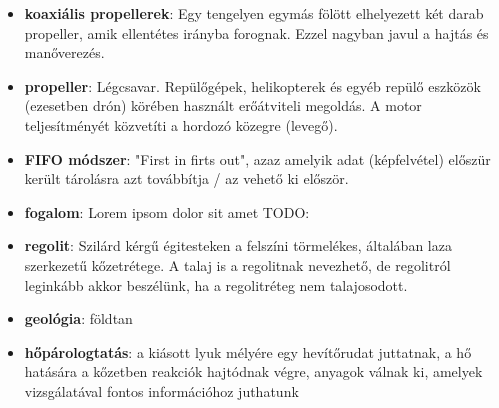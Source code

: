 \documentclass[12pt]{report}
\begin{document}
\begin{itemize}

  \item \textbf{koaxiális propellerek}: Egy tengelyen egymás fölött elhelyezett két darab propeller, amik ellentétes irányba forognak. Ezzel nagyban javul a hajtás és manőverezés.
  \item \textbf{propeller}: Légcsavar. Repülőgépek, helikopterek és egyéb repülő eszközök (ezesetben drón) körében használt erőátviteli megoldás. A motor teljesítményét közvetíti a hordozó közegre (levegő).
  \item \textbf{FIFO módszer}: "First in firts out", azaz amelyik adat (képfelvétel) előszür került tárolásra azt továbbítja / az vehető ki először.

  \item \textbf{fogalom}: Lorem ipsom dolor sit amet TODO:
  \item \textbf{regolit}: Szilárd kérgű égitesteken a felszíni törmelékes, általában laza szerkezetű kőzetrétege. A talaj is a regolitnak nevezhető, de regolitról leginkább akkor beszélünk, ha a regolitréteg nem talajosodott.
  \item \textbf{geológia}: földtan
  \item \textbf{hőpárologtatás}: a kiásott lyuk mélyére egy hevítőrudat juttatnak, a hő hatására a kőzetben reakciók hajtódnak végre, anyagok válnak ki, amelyek vizsgálatával fontos információhoz juthatunk

\end{itemize}
\end{document}
